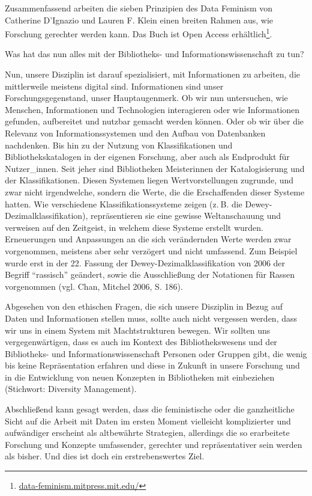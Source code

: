 \documentclass[a4paper,
fontsize=11pt,
oneside,
numbers=noperiodatend,
parskip=half-,
bibliography=totoc,
final
]{scrartcl}
\begin{document}
Zusammenfassend arbeiten die sieben Prinzipien des Data Feminism von
Catherine D'Ignazio und Lauren F. Klein einen breiten Rahmen aus, wie
Forschung gerechter werden kann. Das Buch ist Open Access
erhältlich\footnote{\url{data-feminism.mitpress.mit.edu/}}.

Was hat das nun alles mit der Bibliotheks- und Informationswissenschaft
zu tun?

Nun, unsere Disziplin ist darauf spezialisiert, mit Informationen zu
arbeiten, die mittlerweile meistens digital sind. Informationen sind
unser Forschungsgegenstand, unser Hauptaugenmerk. Ob wir nun
untersuchen, wie Menschen, Informationen und Technologien interagieren
oder wie Informationen gefunden, aufbereitet und nutzbar gemacht werden
können. Oder ob wir über die Relevanz von Informationssystemen und den
Aufbau von Datenbanken nachdenken. Bis hin zu der Nutzung von
Klassifikationen und Bibliothekskatalogen in der eigenen Forschung, aber
auch als Endprodukt für Nutzer\_innen. Seit jeher sind Bibliotheken
Meisterinnen der Katalogisierung und der Klassifikationen. Diesen
Systemen liegen Wertvorstellungen zugrunde, und zwar nicht irgendwelche,
sondern die Werte, die die Erschaffenden dieser Systeme hatten. Wie
verschiedene Klassifikationssysteme zeigen (z. B. die
Dewey-Dezimalklassifikation), repräsentieren sie eine gewisse
Weltanschauung und verweisen auf den Zeitgeist, in welchem diese Systeme
erstellt wurden. Erneuerungen und Anpassungen an die sich verändernden
Werte werden zwar vorgenommen, meistens aber sehr verzögert und nicht
umfassend. Zum Beispiel wurde erst in der 22. Fassung der
Dewey-Dezimalklassifikation von 2006 der Begriff \enquote{rassisch}
geändert, sowie die Ausschließung der Notationen für Rassen vorgenommen
(vgl. Chan, Mitchel 2006, S. 186).

Abgesehen von den ethischen Fragen, die sich unsere Disziplin in Bezug
auf Daten und Informationen stellen muss, sollte auch nicht vergessen
werden, dass wir uns in einem System mit Machtstrukturen bewegen. Wir
sollten uns vergegenwärtigen, dass es auch im Kontext des
Bibliothekswesens und der Bibliotheks- und Informationswissenschaft
Personen oder Gruppen gibt, die wenig bis keine Repräsentation erfahren
und diese in Zukunft in unsere Forschung und in die Entwicklung von
neuen Konzepten in Bibliotheken mit einbeziehen (Stichwort: Diversity
Management).

Abschließend kann gesagt werden, dass die feministische oder die
ganzheitliche Sicht auf die Arbeit mit Daten im ersten Moment vielleicht
komplizierter und aufwändiger erscheint als altbewährte Strategien,
allerdings die so erarbeitete Forschung und Konzepte umfassender,
gerechter und repräsentativer sein werden als bisher. Und dies ist doch
ein erstrebenswertes Ziel.
\end{document}
